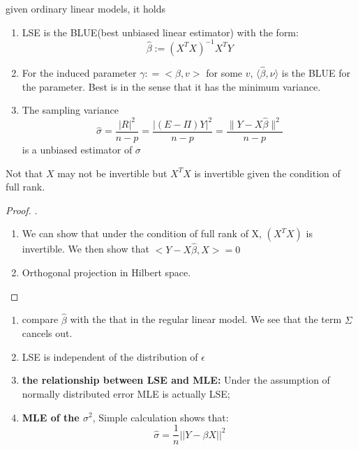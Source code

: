 \begin{theorem}
given ordinary linear models, it holds
\begin{enumerate}
    \item LSE is the BLUE(best unbiased linear estimator) with the  form:
    \begin{equation}
        \hat{\beta} := (X^TX)^{-1}X^TY
    \end{equation}
    \item For the induced parameter $\gamma: = <\beta, v>$ for some $v$, $\langle \hat{\beta}, \nu \rangle$ is the BLUE for the parameter. Best is in the sense that it has the minimum variance.
    \item The sampling variance
    \begin{equation}
    \hat{\sigma} = \frac{|R|^2}{n - p} = \frac{|(E - \Pi)Y|^2}{n - p} =  \frac{\|Y - X\hat{\beta}\|^2}{n - p} 
    \end{equation}
    is a unbiased estimator of $\sigma$
\end{enumerate}
\end{theorem}
Not that $X$ may not be invertible but $X^T X$ is invertible given the condition of full rank.

\begin{proof}.
\begin{enumerate}
    \item We can show that under the condition of full rank of X, $(X^T X)$ is invertible. We then show that $<Y - X\hat{\beta}, X> = 0$
    \item Orthogonal projection in Hilbert space.
    
\end{enumerate}
\end{proof}

\begin{remark}\quad
\begin{enumerate}
    \item compare $\hat{\beta}$ with the that in the regular linear model. We see that the term $\Sigma$ cancels out.
    \item LSE is independent of the distribution of $\epsilon$
    \item \textbf{the relationship between LSE and MLE:} Under the assumption of normally distributed error MLE is actually LSE;
    \item \textbf{MLE of the $\sigma^2$}, Simple calculation shows that: \begin{equation*}
        \hat{\sigma} = \frac{1}{n} ||Y - \beta X||^2
    \end{equation*}
\end{enumerate}
\end{remark}

